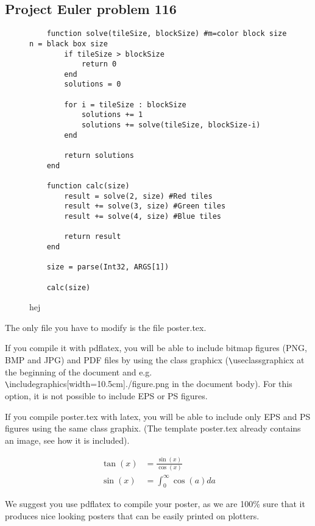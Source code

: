 \documentclass[landscape, a2]{sciposter}
\begin{document}
\begin{multicols}{3}
\section{Project Euler problem 116}

\begin{figure}[H]
\centering
\hspace*{-0.65in}
\begin{lstlisting}
	function solve(tileSize, blockSize) #m=color block size  n = black box size
		if tileSize > blockSize
			return 0
		end
		solutions = 0
	
		for i = tileSize : blockSize
			solutions += 1
			solutions += solve(tileSize, blockSize-i)
		end
	
		return solutions
	end
	
	function calc(size)
		result = solve(2, size) #Red tiles
		result += solve(3, size) #Green tiles
		result += solve(4, size) #Blue tiles
	
		return result
	end
	
	size = parse(Int32, ARGS[1])
	
	calc(size)
\end{lstlisting}
\caption{hej}
\end{figure}

The only file you have to modify is the file poster.tex.

If you compile it with pdflatex, you will be able to include bitmap
figures (PNG, BMP and JPG) and PDF files by using the class graphicx
(\verb!\!useclass{graphicx} at the beginning of the document and e.g.
\verb!\!includegraphics[width=10.5cm]{./figure.png} in the document body).
For this option, it is not possible to include EPS or PS figures.

If you compile poster.tex with latex, you will be able to include
only EPS and PS figures using the same class graphix. (The template
poster.tex already contains an image, see how it is included).

\begin{align}
\tan(x)
	& = \frac{\sin(x)}{\cos(x)}		\\
\sin(x)
	& = \int_0^{\infty} \cos(a) da
\end{align}

We suggest you use pdflatex to compile your poster, as we are 100\%
sure that it produces nice looking posters that can be easily
printed on plotters. 



\end{multicols}
\end{document}
